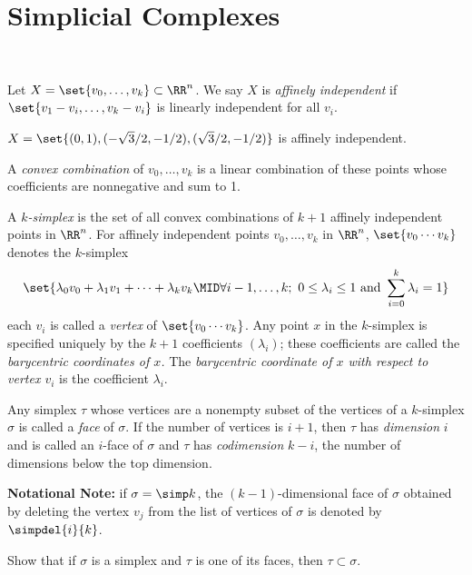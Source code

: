 \section{Simplicial Complexes}~
\begin{definition}
  Let $X = \set{v_0, \ldots, v_k} \subset \RR^n$. We say $X$ is \emph{affinely
    independent} if $\set{v_1 - v_i, \ldots, v_k - v_i}$ is linearly
  independent for all $v_i$.
\end{definition}
\begin{example}
  $X = \set{(0,1), (-\sqrt{3}/2, -1/2), (\sqrt{3}/2, -1/2)}$ is affinely
  independent.
\end{example}
\begin{definition}
  A \emph{convex combination} of $v_0, \ldots, v_k$ is a linear combination
  of these points whose coefficients are nonnegative and sum to 1.
\end{definition}
\begin{definition}[$k$-simplex]
  A \emph{$k$-simplex} is the set of all convex combinations of $k+1$ affinely
  independent points in $\RR^n$. For affinely independent points $v_0, \ldots,
  v_k$ in $\RR^n$, $\set{v_0\cdots v_k}$ denotes the $k$-simplex
  \[
    \set{\lambda_0 v_0 + \lambda_1v_1 + \cdots + \lambda_kv_k \MID \forall i -
      1, \ldots, k;\ 0 \leq \lambda_i \leq 1 \text{ and } \sum_{i=0}^k \lambda_i
    = 1}
  \]
  each $v_i$ is called a \emph{vertex} of $\set{v_0 \cdots v_k}$. Any point $x$
  in the $k$-simplex is specified uniquely by the $k+1$ coefficients
  $(\lambda_i)$; these coefficients are called the \emph{barycentric coordinates
    of $x$.} The \emph{barycentric coordinate of $x$ with respect to vertex
    $v_i$} is the coefficient $\lambda_i$.
\end{definition}
\begin{definition}
  Any simplex $\tau$ whose vertices are a nonempty subset of the vertices of a
  $k$-simplex $\sigma$ is called a \emph{face} of $\sigma$. If the number of
  vertices is $i+1$, then $\tau$ has \emph{dimension} $i$ and is called an
  $i$-face of $\sigma$ and $\tau$ has \emph{codimension} $k-i$, the number of
  dimensions below the top dimension.
\end{definition}
\textbf{Notational Note:} if $\sigma = \simp k$, the $(k-1)$-dimensional face of
$\sigma$ obtained by deleting the vertex $v_j$ from the list of vertices of
$\sigma$ is denoted by $\simpdel{i}{k}$.
\begin{problem}[15.11]
  Show that if $\sigma$ is a simplex and $\tau$ is one of its faces, then $\tau
  \subset \sigma$.
\end{problem}
